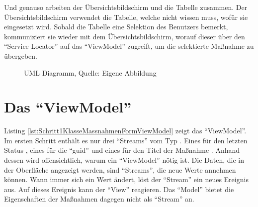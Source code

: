 Und genauso arbeiten der Übersichtsbildschirm und die Tabelle zusammen.
Der Übersichtsbildschirm verwendet die Tabelle, welche nicht wissen muss, wofür sie eingesetzt wird.
Sobald die Tabelle eine Selektion des Benutzers bemerkt, kommuniziert sie wieder mit dem Übersichtsbildschirm, worauf dieser über den \enquote{Service Locator} auf das \enquote{ViewModel} zugreift, um die selektierte Maßnahme zu übergeben.

\ifIncludeFigures
  \begin{figure}[h]
    \centering


    \caption[UML Diagramm]{UML Diagramm, Quelle: Eigene Abbildung}
    \label{lst:UmlOnSelet}

  \end{figure}%
\fi







\section{Das \enquote{ViewModel}}

Listing \ref{lst:Schritt1KlasseMassnahmenFormViewModel} zeigt das \enquote{ViewModel}.
Im ersten Schritt enthält es nur drei \enquote{Streams} vom Typ .
Eines für den letzten Status , eines für die \enquote{guid}  und eines für den Titel der Maßnahme .
Anhand dessen wird offensichtlich, warum ein \enquote{ViewModel} nötig ist.
Die Daten, die in der Oberfläche angezeigt werden, sind \enquote{Streams}, die neue Werte annehmen können.
Wann immer sich ein Wert ändert, löst der \enquote{Stream} ein neues Ereignis aus.
Auf dieses Ereignis kann der \enquote{View} reagieren.
Das \enquote{Model} bietet die Eigenschaften der Maßnahmen dagegen nicht als \enquote{Stream} an.


